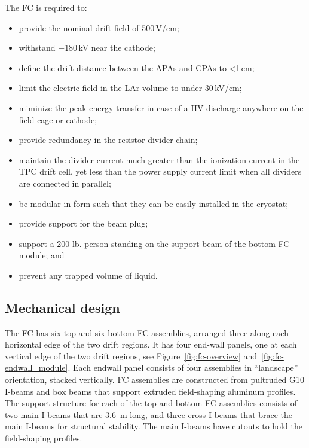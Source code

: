 The FC is required to:
\begin{itemize}
\item provide the nominal drift field of 500\,V/cm;
\item withstand $-$180\,kV near the cathode;
\item define the drift distance between the APAs and CPAs to <1\,cm;
\item limit the electric field in the LAr volume to under 30\,kV/cm;
\item miminize the peak energy transfer in case of a HV discharge anywhere on the field cage or cathode;
\item provide redundancy in the resistor divider chain;
\item maintain the divider current much greater than the ionization current in the TPC drift cell, yet less than the power supply current limit when all dividers are connected in parallel;
\item be modular in form such that they can be easily installed in the cryostat;
\item provide support for the beam plug; 
\item support a 200-lb. person standing on the support beam of the bottom FC module; and
\item prevent any trapped volume of liquid.
\end{itemize}

\subsection{Mechanical design}

The FC has six top and six bottom FC assemblies, arranged three along each horizontal edge of the two drift regions. It has 
four end-wall panels, one at each vertical edge of the two drift regions, see Figure~\ref{fig:fc-overview} and~\ref{fig:fc-endwall_module}.
Each endwall panel consists of four assemblies in ``landscape'' orientation, stacked vertically.
FC assemblies are constructed from pultruded G10 I-beams and box beams that support extruded field-shaping aluminum profiles. The support structure for each of the top and bottom FC assemblies consists of two main I-beams that are 3.6~m long, and three cross I-beams that brace the main I-beams for structural stability. The main I-beams have cutouts to hold the field-shaping profiles. 


